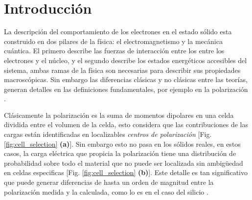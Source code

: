 \chapter{Introducción} %



La descripción del comportamiento de los electrones en el estado sólido esta construido en dos pilares de la física: el electromagnetismo y la mecánica cuántica. El primero describe las fuerzas de interacción entre los entre los electrones y el núcleo, y el segundo describe los estados energéticos accesibles del sistema, ambas ramas de la física son necesarias para describir sus propiedades macroscópicas. Sin embargo las diferencias clásicas y no clásicas entre las teorías, generan detalles en las definiciones fundamentales, por ejemplo en la polarización \cite{Shore2018}.


Clásicamente la polarización es la suma de momentos dipolares en una celda dividida entre el volumen de la celda, esto considera que las contribuciones de las cargas están identificadas en localizables {\it centros de polarización} [Fig. \ref{fig:cell_selection} \textbf{(a)}]. Sin embargo esto no pasa en los sólidos reales, en estos casos, la carga eléctrica que propicia la polarización tiene una distribución de probabilidad sobre todo el material que no puede ser localizada sin ambigüedad en celdas especificas [Fig. \ref{fig:cell_selection} \textbf{(b)}]. Este detalle es tan significativo que puede generar diferencias de hasta un orden de magnitud entre la polarización medida y la calculada, como lo es en el caso del silicio \cite{rabe2007modern}.


